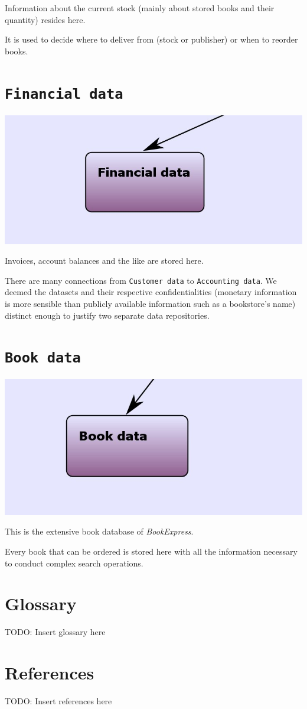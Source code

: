 Information about the current stock (mainly about stored books and their quantity) resides here.

It is used to decide where to deliver from (stock or publisher) or when to reorder books.


\section{\texttt{Financial data}}

\includegraphics[scale=0.8]{screenshots/Financial_data.jpeg}

Invoices, account balances and the like are stored here.

There are many connections from \texttt{Customer data} to \texttt{Accounting data}. We deemed the datasets and their respective confidentialities (monetary
information is more sensible than publicly available information such as a bookstore's name) distinct enough to justify two separate data repositories.


\section{\texttt{Book data}}

\includegraphics[scale=0.8]{screenshots/Book_data.jpeg}

This is the extensive book database of \emph{BookExpress}.

Every book that can be ordered is stored here with all the information necessary to conduct complex search operations.


\newpage
\begin{appendix}
\section{Glossary}
TODO: Insert glossary here
\section{References}
TODO: Insert references here
\end{appendix}



